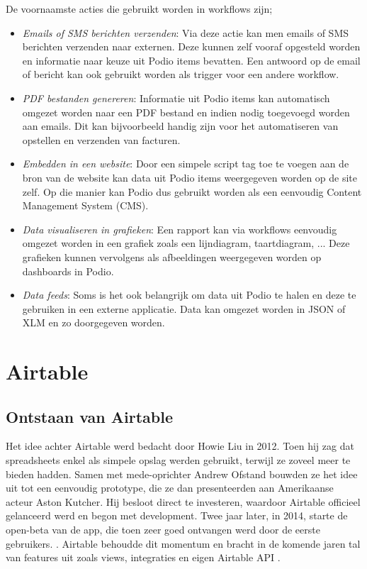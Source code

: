 De voornaamste acties die gebruikt worden in workflows zijn;
\begin{itemize}
    \item \textit{Emails of SMS berichten verzenden}: Via deze actie kan men emails of SMS berichten verzenden naar externen. Deze kunnen zelf vooraf opgesteld worden en informatie naar keuze uit Podio items bevatten. Een antwoord op de email of bericht kan ook gebruikt worden als trigger voor een andere workflow. \autocite{PodioWorkflowFeatures}
    \item \textit{PDF bestanden genereren}: Informatie uit Podio items kan automatisch omgezet worden naar een PDF bestand en indien nodig toegevoegd worden aan emails. Dit kan bijvoorbeeld handig zijn voor het automatiseren van opstellen en verzenden van facturen. \autocite{PodioWorkflowFeatures}
    \item \textit{Embedden in een website}: Door een simpele script tag toe te voegen aan de bron van de website kan data uit Podio items weergegeven worden op de site zelf. Op die manier kan Podio dus gebruikt worden als een eenvoudig Content Management System (CMS). \autocite{PodioWorkflowFeatures}
    \item \textit{Data visualiseren in grafieken}: Een rapport kan via workflows eenvoudig omgezet worden in een grafiek zoals een lijndiagram, taartdiagram, ... Deze grafieken kunnen vervolgens als afbeeldingen weergegeven worden op dashboards in Podio. \autocite{PodioWorkflowFeatures}
    \item \textit{Data feeds}: Soms is het ook belangrijk om data uit Podio te halen en deze te gebruiken in een externe applicatie. Data kan omgezet worden in JSON of XLM en zo doorgegeven worden. \autocite{PodioWorkflowFeatures}
\end{itemize}

\section{Airtable}


\subsection{Ontstaan van Airtable}


Het idee achter Airtable werd bedacht door Howie Liu in 2012. Toen hij zag dat spreadsheets enkel als simpele opslag werden gebruikt, terwijl ze zoveel meer te bieden hadden. Samen met mede-oprichter Andrew Ofstand bouwden ze het idee uit tot een eenvoudig prototype, die ze dan presenteerden aan Amerikaanse acteur Aston Kutcher. Hij besloot direct te investeren, waardoor Airtable officieel gelanceerd werd en begon met development. Twee jaar later, in 2014, starte de open-beta van de app, die toen zeer goed ontvangen werd door de eerste gebruikers. \autocite{Black2019}.
Airtable behoudde dit momentum en bracht in de komende jaren tal van features uit zoals views, integraties en eigen Airtable API \autocite{Shah}.

